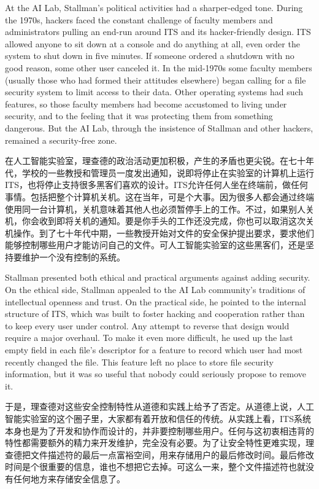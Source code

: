\ifdefined\eng
At the AI Lab, Stallman's political activities had a sharper-edged tone. During the 1970s, hackers faced the constant challenge of faculty members and administrators pulling an end-run around ITS and its hacker-friendly design. ITS allowed anyone to sit down at a console and do anything at all, even order the system to shut down in five minutes. If someone ordered a shutdown with no good reason, some other user canceled it. In the mid-1970s some faculty members (usually those who had formed their attitudes elsewhere) began calling for a file security system to limit access to their data.   Other operating systems had such features, so those faculty members had become accustomed to living under security, and to the feeling that it was protecting them from something dangerous. But the AI Lab, through the insistence of Stallman and other hackers, remained a security-free zone.
\fi

\ifdefined\chs
在人工智能实验室，理查德的政治活动更加积极，产生的矛盾也更尖锐。在七十年代，学校的一些教授和管理员一度发出通知，说即将停止在实验室的计算机上运行ITS，也将停止支持很多黑客们喜欢的设计。ITS允许任何人坐在终端前，做任何事情。包括把整个计算机关机。这在当年，可是个大事。因为很多人都会通过终端使用同一台计算机，关机意味着其他人也必须暂停手上的工作。不过，如果别人关机，你会收到即将关机的通知。要是你手头的工作还没完成，你也可以取消这次关机操作。到了七十年代中期，一些教授开始对文件的安全保护提出要求，要求他们能够控制哪些用户才能访问自己的文件。可人工智能实验室的这些黑客们，还是坚持要维护一个没有控制的系统。
\fi

\ifdefined\eng
Stallman presented both ethical and practical arguments against adding security. On the ethical side, Stallman appealed to the AI Lab community's traditions of intellectual openness and trust. On the practical side, he pointed to the internal structure of ITS, which was built to foster hacking and cooperation rather than to keep every user under control.  Any attempt to reverse that design would require a major overhaul. To make it even more difficult, he used up the last empty field in each file's descriptor for a feature to record which user had most recently changed the file. This feature left no place to store file security information, but it was so useful that nobody could seriously propose to remove it.
\fi

\ifdefined\chs
于是，理查德对这些安全控制特性从道德和实践上给予了否定。从道德上说，人工智能实验室的这个圈子里，大家都有着开放和信任的传统。从实践上看，ITS系统本身也是为了开发和协作而设计的，并非要控制哪些用户。任何与这初衷相违背的特性都需要额外的精力来开发维护，完全没有必要。为了让安全特性更难实现，理查德把文件描述符的最后一点富裕空间，用来存储用户的最后修改时间。最后修改时间是个很重要的信息，谁也不想把它去掉。可这么一来，整个文件描述符也就没有任何地方来存储安全信息了。
\fi


